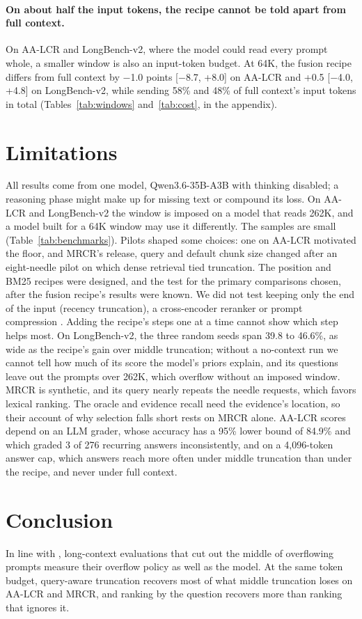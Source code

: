 \documentclass[letterpaper]{article} %
\newcommand{\recipe}{fusion recipe}
\begin{document}
\paragraph{On about half the input tokens, the recipe cannot be told apart from full context.} On AA-LCR and LongBench-v2, where the model could read every prompt whole, a smaller window is also an input-token budget. At 64K, the \recipe{} differs from full context by $-$1.0 points [$-$8.7, +8.0] on AA-LCR and +0.5 [$-$4.0, +4.8] on LongBench-v2, while sending 58\% and 48\% of full context's input tokens in total (Tables~\ref{tab:windows} and~\ref{tab:cost}, in the appendix).


\section{Limitations}
All results come from one model, Qwen3.6-35B-A3B with thinking disabled; a reasoning phase might make up for missing text or compound its loss. On AA-LCR and LongBench-v2 the window is imposed on a model that reads 262K, and a model built for a 64K window may use it differently. The samples are small (Table~\ref{tab:benchmarks}). Pilots shaped some choices: one on AA-LCR motivated the floor, and MRCR's release, query and default chunk size changed after an eight-needle pilot on which dense retrieval tied truncation. The position and BM25 recipes were designed, and the test for the primary comparisons chosen, after the \recipe's results were known. We did not test keeping only the end of the input (recency truncation), a cross-encoder reranker or prompt compression \cite{jiang2024longllmlingua}. Adding the recipe's steps one at a time cannot show which step helps most. On LongBench-v2, the three random seeds span 39.8 to 46.6\%, as wide as the recipe's gain over middle truncation; without a no-context run we cannot tell how much of its score the model's priors explain, and its questions leave out the prompts over 262K, which overflow without an imposed window. MRCR is synthetic, and its query nearly repeats the needle requests, which favors lexical ranking. The oracle and evidence recall need the evidence's location, so their account of why selection falls short rests on MRCR alone. AA-LCR scores depend on an LLM grader, whose accuracy has a 95\% lower bound of 84.9\% and which graded 3 of 276 recurring answers inconsistently, and on a 4,096-token answer cap, which answers reach more often under middle truncation than under the recipe, and never under full context.

\section{Conclusion}
In line with \citet{arjmandi2026distractor}, long-context evaluations that cut out the middle of overflowing prompts measure their overflow policy as well as the model. At the same token budget, query-aware truncation recovers most of what middle truncation loses on AA-LCR and MRCR, and ranking by the question recovers more than ranking that ignores it.
\end{document}
